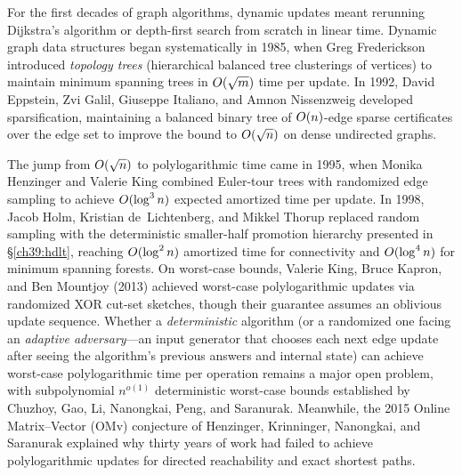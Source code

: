 \begin{historybox}
For the first decades of graph algorithms, dynamic updates meant rerunning Dijkstra's
algorithm or depth-first search from scratch in linear time. Dynamic graph data
structures began systematically in 1985, when Greg Frederickson introduced
\emph{topology trees} (hierarchical balanced tree clusterings of vertices) to maintain
minimum spanning trees in $O(\sqrt{m})$ time per update. In 1992, David Eppstein, Zvi
Galil, Giuseppe Italiano, and Amnon Nissenzweig developed sparsification, maintaining a
balanced binary tree of $O(n)$-edge sparse certificates over the edge set to improve
the bound to $O(\sqrt{n})$ on dense undirected graphs.

The jump from $O(\sqrt{n})$ to polylogarithmic time came in 1995, when Monika
Henzinger and Valerie King combined Euler-tour trees with randomized edge sampling to
achieve $O(\log^3 n)$ expected amortized time per update. In 1998, Jacob Holm,
Kristian de~Lichtenberg, and Mikkel Thorup replaced random sampling with the
deterministic smaller-half promotion hierarchy presented in \S\ref{ch39:hdlt}, reaching
$O(\log^2 n)$ amortized time for connectivity and $O(\log^4 n)$ for minimum spanning
forests. On worst-case bounds, Valerie King, Bruce Kapron, and Ben Mountjoy (2013)
achieved worst-case polylogarithmic updates via randomized XOR cut-set sketches, though
their guarantee assumes an oblivious update sequence. Whether a \emph{deterministic}
algorithm (or a randomized one facing an \emph{adaptive adversary}---an input generator
that chooses each next edge update after seeing the algorithm's previous answers and
internal state) can achieve worst-case polylogarithmic time per operation remains a
major open problem, with subpolynomial $n^{o(1)}$ deterministic worst-case bounds established
by Chuzhoy, Gao, Li, Nanongkai, Peng, and Saranurak. Meanwhile, the 2015 Online
Matrix--Vector ($\mathrm{OMv}$) conjecture of Henzinger, Krinninger, Nanongkai, and
Saranurak explained why thirty years of work had failed to achieve polylogarithmic
updates for directed reachability and exact shortest paths.
\end{historybox}

